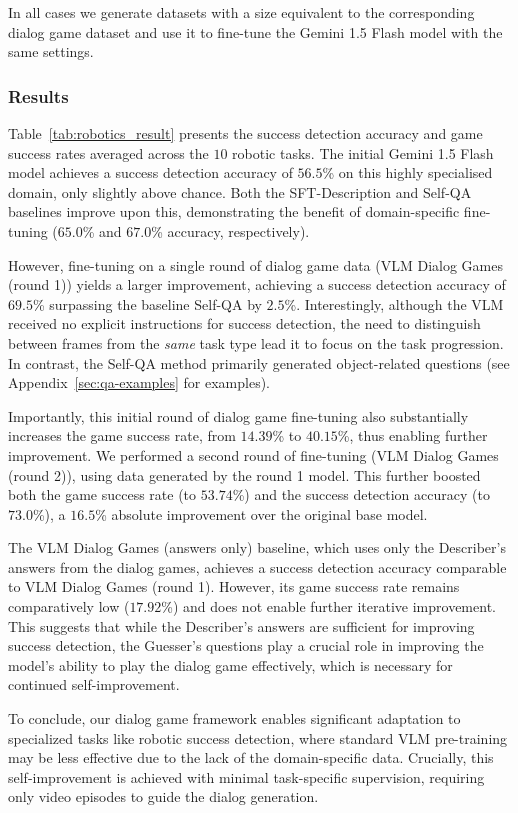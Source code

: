 In all cases we generate datasets with a size equivalent to the corresponding dialog game dataset and use it to fine-tune the Gemini 1.5 Flash model with the same settings.


\subsubsection{Results}
\label{sec:exps-robotics-results}

Table~\ref{tab:robotics_result} presents the success detection accuracy and game success rates averaged across the $10$ robotic tasks.
The initial Gemini 1.5 Flash model achieves a success detection accuracy of $56.5$\% on this highly specialised domain, only slightly above chance. 
Both the SFT-Description and Self-QA baselines improve upon this, demonstrating the benefit of domain-specific fine-tuning ($65.0$\% and $67.0$\% accuracy, respectively).

However, fine-tuning on a single round of dialog game data (VLM Dialog Games (round 1)) yields a larger improvement, achieving a success detection accuracy of $69.5$\% surpassing the baseline Self-QA by $2.5$\%.
Interestingly, although the VLM received no explicit instructions for success detection, the need to distinguish between frames from the \textit{same} task type lead it to focus on the task progression.
In contrast, the Self-QA method primarily generated object-related questions (see Appendix~\ref{sec:qa-examples} for examples).

Importantly, this initial round of dialog game fine-tuning also substantially increases the game success rate, from $14.39$\% to $40.15$\%, thus enabling further improvement.
We performed a second round of fine-tuning (VLM Dialog Games (round 2)), using data generated by the round 1 model.
This further boosted both the game success rate (to $53.74$\%) and the success detection accuracy (to $73.0$\%), a $16.5$\% absolute improvement over the original base model.

The VLM Dialog Games (answers only) baseline, which uses only the Describer's answers from the dialog games, achieves a success detection accuracy comparable to VLM Dialog Games (round 1). 
However, its game success rate remains comparatively low ($17.92$\%) and does not enable further iterative improvement.
This suggests that while the Describer's answers are sufficient for improving success detection, the Guesser's questions play a crucial role in improving the model's ability to play the dialog game effectively, which is necessary for continued self-improvement.

To conclude, our dialog game framework enables significant adaptation to specialized tasks like robotic success detection, where standard VLM pre-training may be less effective due to the lack of the domain-specific data.
Crucially, this self-improvement is achieved with minimal task-specific supervision, requiring only video episodes to guide the dialog generation.
